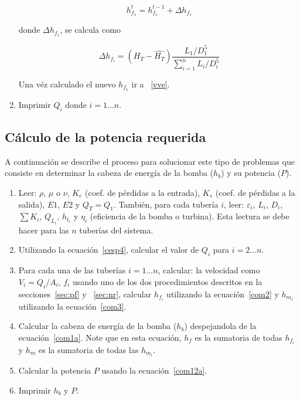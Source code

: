 \documentclass[10pt, oneside]{article}
\begin{document}
\begin{enumerate}
\begin{equation} 
h_{f_1}^t  = h_{f_1}^{t-1}  + \Delta h_{f_1}
\label{cpd2}
\end{equation}

donde $\Delta h_{f_1}$, se calcula como

\begin{equation} 
\Delta h_{f_i} = (H_T - \hat{H_T}) \frac{L_1 / D_1^5}{\sum_{i=1}^{n} L_i / D_i^5 }
\label{cpd3}
\end{equation}

Una v\'ez calculado el nuevo $h_{f_1}$ ir a ~\ref{vve}.

\item \label{prf} Imprimir $Q_i$ donde $i = 1 ... n$. 

\end{enumerate}
\subsection{C\'alculo de la potencia requerida}
A continuaci\'on se describe el proceso para solucionar este tipo de problemas que consiste en determinar la cabeza de energ\'ia de la bomba ($h_b$) y su potencia  ($P$).

\begin{enumerate}
\item Leer: $\rho$, $\mu$ o $\nu$, $K_e$ (coef. de p\'erdidas a la entrada), $K_s$ (coef. de p\'erdidas a la salida), $E1$, $E2$ y $Q_T = Q_1$. Tambi\'en, para cada tuber\'ia $i$, leer: $\varepsilon_i$, $L_i$, $D_i$, $\sum K_i$, $Q_{L_i}$, $h_{t_i}$ y $\eta_i$ (eficiencia de la bomba o turbina). Esta lectura se debe hacer para las $n$ tuber\'ias del sistema.
\item Utilizando la ecuaci\'on~\ref{cesp4}, calcular el valor de $Q_i$ para $i=2...n$.
\item Para cada una de las tuber\'ias $i=1...n$, calcular: la velocidad como $V_i = Q_i /A_i $, $f_i$ usando uno de los dos procedimientos descritos en la secciones~\ref{sec:pf} y ~\ref{sec:nr}, calcular $h_{f_i}$ utilizando la ecuaci\'on~\ref{com2} y $h_{m_i}$  utilizando la ecuaci\'on~\ref{com3}.
\item Calcular la cabeza de energ\'ia de la bomba ($h_b$) despejandola de la ecuaci\'on~\ref{com1a}. Note que  en esta ecuaci\'on, $h_f$ es la sumatoria de todas $h_{f_i}$ y $h_m$ es la sumatoria de todas las $h_{m_i}$. 
\item Calcular la potencia $P$ usando la ecuaci\'on~\ref{com12a}.
\item Imprimir $h_b$ y $P$.
\end{enumerate}
\end{document}
